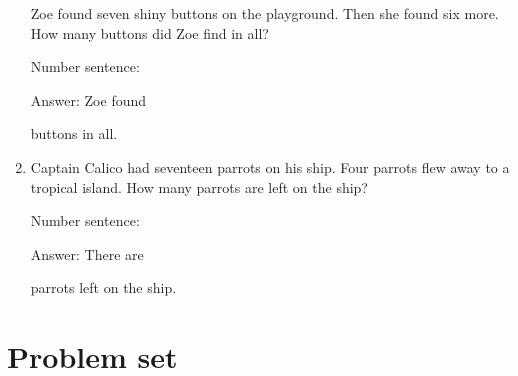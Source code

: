 \documentclass{tufte-book}
\begin{document}
\begin{enumerate}
  Zoe found seven shiny buttons on the playground. Then she found six
  more. How many buttons did Zoe find in all?\medskip\par
  Number sentence:
  \dotfill\medskip\par
  Answer: Zoe found
  \dotfill\medskip\par\mbox{}\dotfill\medskip\par\mbox{}\dotfill\bigskip
  buttons in all.
\item
  Captain Calico had seventeen parrots on his ship. Four parrots flew
  away to a tropical island. How many parrots are left on the ship?\medskip\par
  Number sentence:
  \dotfill\medskip\par
  Answer: There are
  \dotfill\medskip\par\mbox{}\dotfill\medskip\par\mbox{}\dotfill\bigskip
  parrots left on the ship.
\end{enumerate}



\clearpage\section{Problem set }
\end{document}
